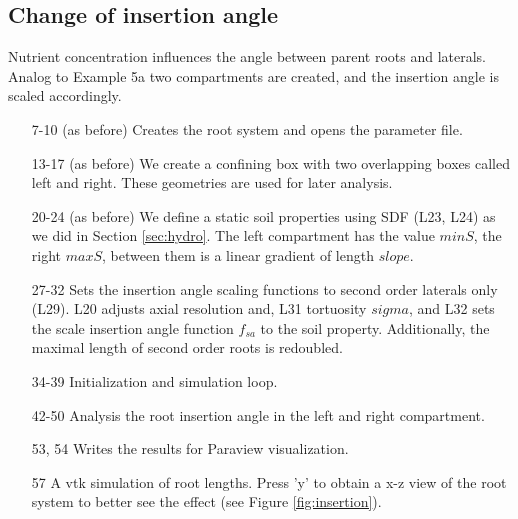 \subsection{Change of insertion angle} \label{sec:insertion_angle}

Nutrient concentration influences the angle between parent roots and laterals. %
Analog to Example 5a two compartments are created, and the insertion angle is scaled accordingly.



\begin{itemize}

\item[7-10] (as before) Creates the root system and opens the parameter file.

\item[13-17](as before) We create a confining box with two overlapping boxes called left and right. These geometries are used for later analysis.

\item[20-24] (as before) We define a static soil properties using SDF (L23, L24) as we did in Section \ref{sec:hydro}. 
The left compartment has the value $minS$, the right $maxS$, between them is a linear gradient of length $slope$.

\item[27-32] Sets the insertion angle scaling functions to second order laterals only (L29). L20 adjusts axial resolution and, L31 tortuosity $sigma$, and L32 sets the scale insertion angle function $f_{sa}$ to the soil property. Additionally, the maximal length of second order roots is redoubled. 

\item[34-39] Initialization and simulation loop.

\item[42-50] Analysis the root insertion angle in the left and right compartment. 

\item[53, 54] Writes the results for Paraview visualization.

\item[57] A vtk simulation of root lengths. Press 'y' to obtain a x-z view of the root system to better see the effect (see Figure \ref{fig:insertion}). 

\end{itemize}

